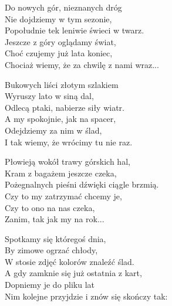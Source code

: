 \begin{text}
    \chordfill
    Do nowych gór, nieznanych dróg\\
    Nie dojdziemy w tym sezonie,\\
    Popołudnie tek leniwie świeci w twarz.\\
    Jeszcze z góry oglądamy świat,\\
    Choć czujemy już lata koniec,\\
    Chociaż wiemy, że za chwilę z nami wraz...

    \vin Bukowych liści złotym szlakiem\\
    \vin Wyruszy lato w siną dal,\\
    \vin Odlecą ptaki, nabierze siły wiatr.\\
    \vin A my spokojnie, jak na spacer,\\
    \vin Odejdziemy za nim w ślad,\\
    \vin I tak wiemy, że wrócimy tu nie raz.

    Płowieją wokół trawy górskich hal,\\
    Kram z bagażem jeszcze czeka,\\
    Pożegnalnych pieśni dźwięki ciągle brzmią.\\
    Czy to my zatrzymać chcemy je,\\
    Czy to ono na nas czeka,\\
    Zanim, tak jak my na rok...

    Spotkamy się któregoś dnia,\\
    By zimowe ogrzać chłody,\\
    W stosie zdjęć kolorów znaleźć ślad.\\
    A gdy zamknie się już ostatnia z kart,\\
    Dopniemy je do pliku lat\\
    Nim kolejne przyjdzie i znów się skończy tak:
\end{text}
